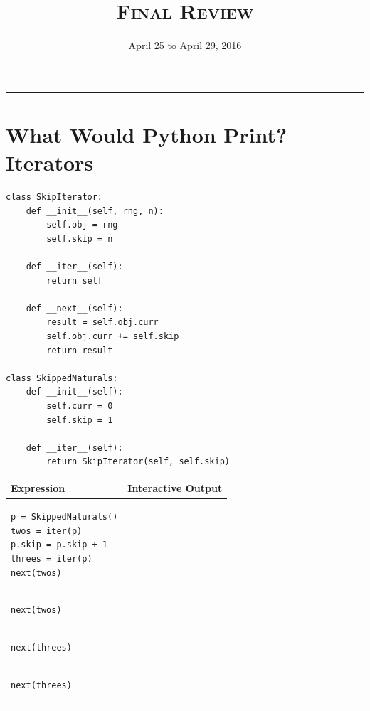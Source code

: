 \documentclass{exam}
\title{\textsc{Final Review}}
\date{April 25 to April 29, 2016}
\begin{document}
\maketitle
\rule{\textwidth}{0.15em}
\fontsize{12}{15}\selectfont


\section{What Would Python Print? Iterators}
\begin{questions}

\begin{blocksection}
\question
\begin{lstlisting}
class SkipIterator:
    def __init__(self, rng, n):
        self.obj = rng
        self.skip = n

    def __iter__(self):
        return self

    def __next__(self):
        result = self.obj.curr
        self.obj.curr += self.skip
        return result

class SkippedNaturals:
    def __init__(self):
        self.curr = 0
        self.skip = 1

    def __iter__(self):
        return SkipIterator(self, self.skip)
\end{lstlisting}
\end{blocksection}

\begin{blocksection}
\begin{tabular}{|l|l|}
\hline
\textbf{Expression} & \textbf{Interactive Output}\\\hline
\begin{lstlisting}
p = SkippedNaturals()
twos = iter(p)
p.skip = p.skip + 1
threes = iter(p)
next(twos)
\end{lstlisting}
& \\\hline
\begin{lstlisting}
next(twos)
\end{lstlisting}
& \\\hline
\begin{lstlisting}
next(threes)
\end{lstlisting}
& \\\hline
\begin{lstlisting}
next(threes)
\end{lstlisting}
& \\\hline
\end{tabular}


\end{blocksection}
\end{questions}
\end{document}
